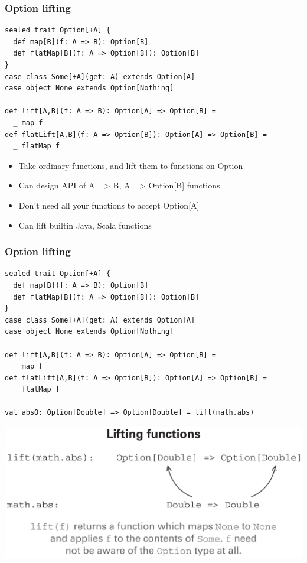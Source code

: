 \documentclass{beamer}
\begin{document}
\begin{frame}[fragile,t]
  \frametitle{{\ttfamily Option} lifting}
\begin{lstlisting}
sealed trait Option[+A] {
  def map[B](f: A => B): Option[B]
  def flatMap[B](f: A => Option[B]): Option[B]
}
case class Some[+A](get: A) extends Option[A]
case object None extends Option[Nothing]

def lift[A,B](f: A => B): Option[A] => Option[B] =
  _ map f
def flatLift[A,B](f: A => Option[B]): Option[A] => Option[B] =
  _ flatMap f
\end{lstlisting}
\begin{itemize}
  \item Take ordinary functions, and lift them to functions on {\ttfamily Option}
  \item Can design API of {\ttfamily A => B}, {\ttfamily A => Option[B]} functions
  \item Don't need all your functions to accept {\ttfamily Option[A]}
  \item Can lift builtin Java, Scala functions
\end{itemize}
\end{frame}

\begin{frame}[fragile,t]
  \frametitle{{\ttfamily Option} lifting}
\begin{lstlisting}
sealed trait Option[+A] {
  def map[B](f: A => B): Option[B]
  def flatMap[B](f: A => Option[B]): Option[B]
}
case class Some[+A](get: A) extends Option[A]
case object None extends Option[Nothing]

def lift[A,B](f: A => B): Option[A] => Option[B] =
  _ map f
def flatLift[A,B](f: A => Option[B]): Option[A] => Option[B] =
  _ flatMap f

val absO: Option[Double] => Option[Double] = lift(math.abs)
\end{lstlisting}
\begin{center}
  \includegraphics[scale=.13]{lift.png}
\end{center}
\end{frame}
\end{document}
